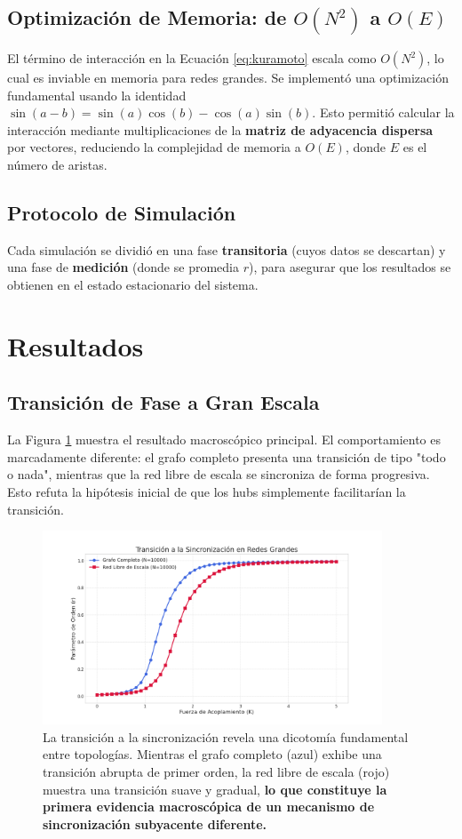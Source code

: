 \documentclass[12pt, a4paper]{article}
\begin{document}
\subsection{Optimización de Memoria: de \(O(N^2)\) a \(O(E)\)}
El término de interacción en la Ecuación \ref{eq:kuramoto} escala como \(O(N^2)\), lo cual es inviable en memoria para redes grandes. Se implementó una optimización fundamental usando la identidad \(\sin(a-b) = \sin(a)\cos(b) - \cos(a)\sin(b)\). Esto permitió calcular la interacción mediante multiplicaciones de la \textbf{matriz de adyacencia dispersa} por vectores, reduciendo la complejidad de memoria a \(O(E)\), donde \(E\) es el número de aristas.

\subsection{Protocolo de Simulación}
Cada simulación se dividió en una fase \textbf{transitoria} (cuyos datos se descartan) y una fase de \textbf{medición} (donde se promedia \(r\)), para asegurar que los resultados se obtienen en el estado estacionario del sistema.

\section{Resultados}

\subsection{Transición de Fase a Gran Escala}
La Figura \ref{fig:r_vs_k} muestra el resultado macroscópico principal. El comportamiento es marcadamente diferente: el grafo completo presenta una transición de tipo "todo o nada", mientras que la red libre de escala se sincroniza de forma progresiva. Esto refuta la hipótesis inicial de que los hubs simplemente facilitarían la transición.

\begin{figure}[htbp]
    \centering
    \includegraphics[width=0.9\textwidth]{img/1.png}
    \caption{La transición a la sincronización revela una dicotomía fundamental entre topologías. Mientras el grafo completo (azul) exhibe una transición abrupta de primer orden, la red libre de escala (rojo) muestra una transición suave y gradual, \textbf{lo que constituye la primera evidencia macroscópica de un mecanismo de sincronización subyacente diferente.}}
    \label{fig:r_vs_k}
\end{figure}
\end{document}
